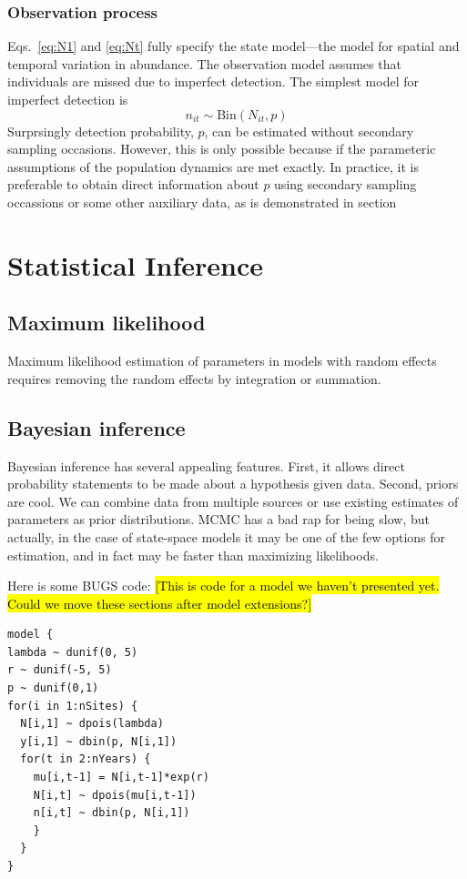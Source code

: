 \documentclass[12pt]{article}
\begin{document}
\subsubsection{Observation process}

Eqs.~\ref{eq:N1} and \ref{eq:Nt} fully specify the state model---the
model for spatial and temporal variation in abundance. The observation
model assumes that individuals are missed due to imperfect
detection. The simplest model for imperfect detection is
\begin{equation}
  n_{it} \sim \mathrm{Bin}(N_{it}, p)
  \label{eq:p1}
\end{equation}
Surprsingly detection probability, $p$, can be estimated without
secondary sampling occasions. However, this is only possible because
if the parameteric assumptions of the population dynamics are met
exactly. In practice, it is preferable to obtain direct information
about $p$ using secondary sampling occassions or some other auxiliary
data, as is demonstrated in section


\section{Statistical Inference}

\subsection{Maximum likelihood}

Maximum likelihood estimation of parameters in models with random
effects requires removing the random effects by integration or
summation.



\subsection{Bayesian inference}

Bayesian inference has several appealing features. First, it allows
direct probability statements to be made about a hypothesis given
data. Second, priors are cool. We can combine data from multiple
sources or use existing estimates of parameters as prior
distributions. MCMC has a bad rap for being slow, but actually, in the
case of state-space models it may be one of the few options for
estimation, and in fact may be faster than maximizing likelihoods.

Here is some BUGS code: \hl{[This is code for a model we haven't
presented yet.  Could we move these sections after model extensions?]}
\begin{verbatim}
model {
lambda ~ dunif(0, 5)
r ~ dunif(-5, 5)
p ~ dunif(0,1)
for(i in 1:nSites) {
  N[i,1] ~ dpois(lambda)
  y[i,1] ~ dbin(p, N[i,1])
  for(t in 2:nYears) {
    mu[i,t-1] = N[i,t-1]*exp(r)
    N[i,t] ~ dpois(mu[i,t-1])
    n[i,t] ~ dbin(p, N[i,1])
    }
  }
}
\end{verbatim}
\end{document}
